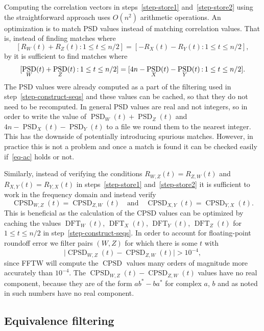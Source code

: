 \documentclass[12pt]{article}
\numberwithin{equation}{section}
\DeclareMathOperator{\PSD}{PSD}
\DeclareMathOperator{\CPSD}{CPSD}
\DeclareMathOperator{\DFT}{DFT}
\begin{document}
Computing the correlation vectors in steps~\ref{step-store1} and~\ref{step-store2} using
the straightforward approach uses $O(n^2)$ arithmetic operations.  An optimization
is to match PSD values instead of matching correlation values.  That is,
instead of finding matches where
\[[R_W(t)+R_Z(t):1\leq t\leq n/2]=[-R_X(t)-R_Y(t):1\leq t\leq n/2],\]
by  it is sufficient to find matches where
\[[\PSD_W(t)+\PSD_Z(t)\mspace{-1.5mu}:\mspace{-1.5mu}1\leq t\leq n/2]=[4n-\PSD_X(t)-\PSD_Y(t)\mspace{-1.5mu}:\mspace{-1.5mu}1\leq t\leq n/2].\]
The PSD values were already computed as a part of the filtering used in step~\ref{step-construct-seqs} and
these values can be cached, so that they do not need to be recomputed.
In general PSD values are real and not integers, so
in order to write the value of $\PSD_W(t)+\PSD_Z(t)$ and $4n-\PSD_X(t)-\PSD_Y(t)$ to a file we round
them to the nearest integer.
This has the downside of potentially introducing spurious matches.  However, in practice this is
not a problem and once a match is found it can be checked easily if~\eqref{eq-ac} holds or not.

Similarly, instead of verifying the conditions
$R_{W,Z}(t)=R_{Z,W}(t)$ and $R_{X,Y}(t)=R_{Y,X}(t)$ in steps~\ref{step-store1} and~\ref{step-store2}
it is sufficient to work in the frequency domain and instead verify
\[ \CPSD_{W,Z}(t)=\CPSD_{Z,W}(t) \quad\text{and}\quad \CPSD_{X,Y}(t)=\CPSD_{Y,X}(t) . \]
This is beneficial as the calculation of the CPSD values can be optimized
by caching the values $\DFT_W(t)$, $\DFT_X(t)$, $\DFT_Y(t)$,
$\DFT_Z(t)$ for $1\leq t\leq n/2$ in step~\ref{step-construct-seqs}.
In order to account for floating-point roundoff error
we filter pairs $(W,Z)$ for which there is some $t$ with
\[ \lvert\CPSD_{W,Z}(t)-\CPSD_{Z,W}(t)\rvert > 10^{-4} , \]
since FFTW will compute
the $\CPSD$ values many orders of magnitude more accurately than $10^{-4}$.
The $\CPSD_{W,Z}(t)-\CPSD_{Z,W}(t)$ values have no real component, because
they are of the form $ab^*-ba^*$ for complex $a$, $b$ and as noted
in  such numbers have no real component.

\subsection{Equivalence filtering}\label{sec:equiv_filtering}
\end{document}
